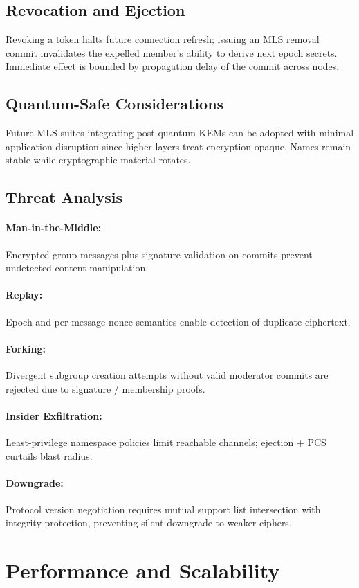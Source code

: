 \documentclass{article}
\theoremstyle{definition}
\theoremstyle{remark}
\begin{document}
\subsection{Revocation and Ejection}
Revoking a token halts future connection refresh; issuing an MLS removal
commit invalidates the expelled member's ability to derive next epoch
secrets. Immediate effect is bounded by propagation delay of the commit across
nodes.
\subsection{Quantum-Safe Considerations}
Future MLS suites integrating post-quantum KEMs can be adopted with minimal
application disruption since higher layers treat encryption opaque. Names
remain stable while cryptographic material rotates.
\subsection{Threat Analysis}
\paragraph{Man-in-the-Middle:} Encrypted group messages plus signature
validation on commits prevent undetected content manipulation.
\paragraph{Replay:} Epoch and per-message nonce semantics enable detection of
duplicate ciphertext.
\paragraph{Forking:} Divergent subgroup creation attempts without valid
moderator commits are rejected due to signature / membership proofs.
\paragraph{Insider Exfiltration:} Least-privilege namespace policies limit
reachable channels; ejection + PCS curtails blast radius.
\paragraph{Downgrade:} Protocol version negotiation requires mutual support
list intersection with integrity protection, preventing silent downgrade to
weaker ciphers.

\section{Performance and Scalability}\label{sec:performance}
\end{document}
